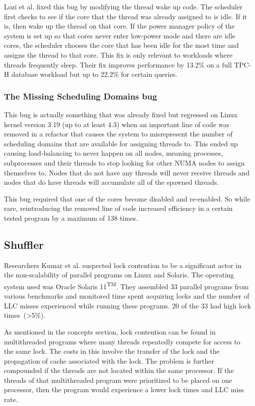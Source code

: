 \documentclass{sig-alternate}
\begin{document}
Lozi et al. fixed this bug by modifying the thread wake up code. The scheduler first checks to see if the core that the thread was already assigned to is idle. If it is, then wake up the thread on that core. If the power manager policy of the system is set up so that cores never enter low-power mode and there are idle cores, the scheduler chooses the core that has been idle for the most time and assigns the thread to that core. This fix is only relevant to workloads where threads frequently sleep. Their fix improves performance by 13.2\% on a full TPC-H database workload but up to 22.2\% for certain queries.~\cite{Lozi:2016}

\subsubsection{The Missing Scheduling Domains bug}
\label{sec:cfsfault_missingsched}

This bug is actually something that was already fixed but regressed on Linux kernel version 3.19 (up to at least 4.3) when an important line of code was removed in a refactor that causes the system to misrepresent the number of scheduling domains that are available for assigning threads to. This ended up causing load-balancing to never happen on all nodes, meaning processes, subprocesses and their threads to stop looking for other NUMA nodes to assign themselves to. Nodes that do not have any threads will never receive threads and nodes that do have threads will accumulate all of the spawned threads.

This bug required that one of the cores become disabled and re-enabled. So while rare, reintroducing the removed line of code increased efficiency in a certain tested program by a maximum of 138 times.~\cite{Lozi:2016}

\subsection{Shuffler}
\label{sec:shuffler}

Researchers Kumar et al. suspected lock contention to be a significant actor in the non-scalability of parallel programs on Linux and Solaris. The operating system used was Oracle Solaris 11\textsuperscript{TM}. They assembled 33 parallel programs from various benchmarks and monitored time spent acquiring locks and the number of LLC misses experienced while running these programs. 20 of the 33 had high lock times~(>5\%).

As mentioned in the concepts section, lock contention can be found in multithreaded programs where many threads repeatedly compete for access to the same lock. The costs in this involve the transfer of the lock and the propagation of cache associated with the lock. The problem is further compounded if the threads are not located within the same processor. If the threads of that multithreaded program were prioritized to be placed on one processor, then the program would experience a lower lock times and LLC miss rate.
\end{document}

